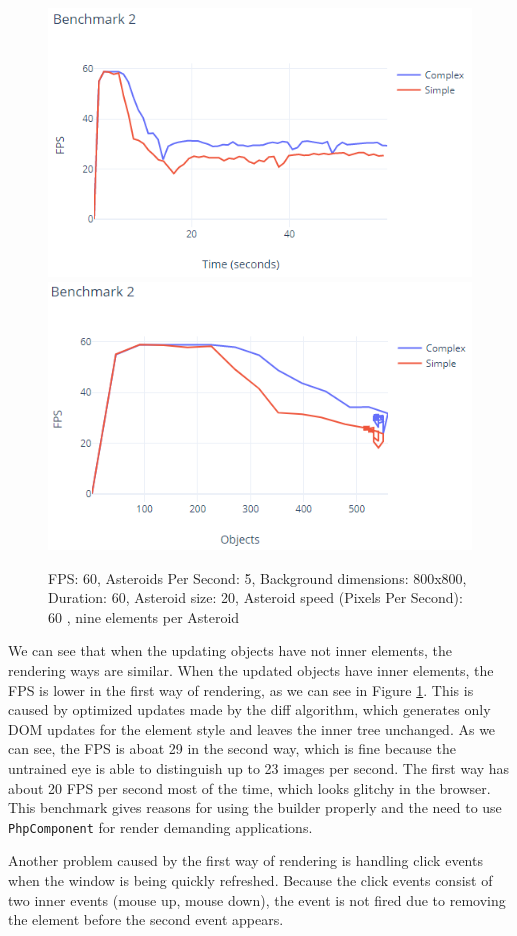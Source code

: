 \begin{figure}\centering
\includegraphics{./img/graph_4}
\includegraphics{./img/graph_3}
\caption{FPS: 60, Asteroids Per Second: 5, Background dimensions: 800x800, Duration: 60, Asteroid size: 20, Asteroid speed (Pixels Per Second): 60 , nine elements per Asteroid}
\label{img32:benchmark2}
\end{figure} 
\par
We can see that when the updating objects have not inner elements, the rendering ways are similar.
When the updated objects have inner elements, the FPS is lower in the first way of rendering, as we can see in Figure \ref{img32:benchmark2}.
This is caused by optimized updates made by the diff algorithm, which generates only DOM updates for the element style and leaves the inner tree unchanged.
As we can see, the FPS is aboat 29 in the second way, which is fine because the untrained eye is able to distinguish up to 23 images per second.
The first way has about 20 FPS per second most of the time, which looks glitchy in the browser.
This benchmark gives reasons for using the builder properly and the need to use \texttt{PhpComponent} for render demanding applications.
\par
Another problem caused by the first way of rendering is handling click events when the window is being quickly refreshed.
Because the click events consist of two inner events (mouse up, mouse down), the event is not fired due to removing the element before the second event appears.

